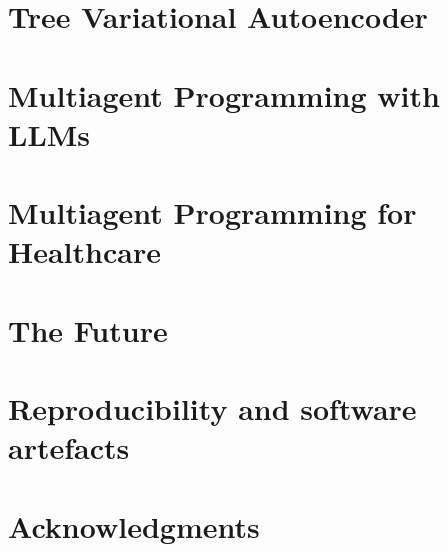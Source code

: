\newpage
\chapter{Tree Variational Autoencoder}\label{ch:tree2tree}


\newpage
\chapter{Multiagent Programming with LLMs}\label{ch:seidr}


\newpage
\chapter{Multiagent Programming for Healthcare}\label{ch:seidrforhealth}

\newpage
\chapter{The Future} \label{ch:mimicseq}


\newpage
\chapter{Reproducibility and software artefacts}





\newpage
\chapter{Acknowledgments}



\printbibliography


